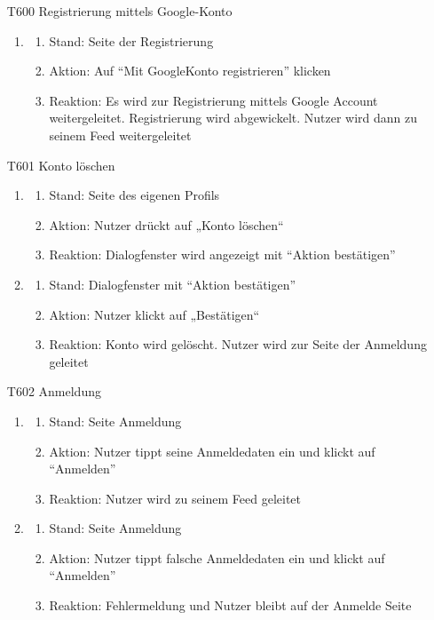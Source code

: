 \documentclass[parskip=full]{scrartcl}
\begin{document}
	\begin{itemize}
		\item[T600] Registrierung mittels Google-Konto
		\begin{enumerate}
			\item
			\begin{enumerate}[nosep]	
				\item Stand: Seite der Registrierung
				\item Aktion:  Auf “Mit \gls{GoogleKonto} registrieren” klicken
				\item Reaktion: Es  wird zur Registrierung mittels Google Account weitergeleitet. Registrierung wird abgewickelt. Nutzer wird dann zu seinem \gls{Feed} weitergeleitet
			\end{enumerate} 
		\end{enumerate}
		
		
		
		\item[T601] Konto löschen
		\begin{enumerate}
			\item
			\begin{enumerate}[nosep]	
				\item Stand: Seite des eigenen Profils
				\item Aktion: Nutzer  drückt auf „Konto löschen“
				\item Reaktion: Dialogfenster wird angezeigt mit “Aktion bestätigen”
			\end{enumerate} 
			\item
			\begin{enumerate}[nosep]	
				\item Stand: Dialogfenster mit “Aktion bestätigen”
				\item Aktion: Nutzer klickt auf „Bestätigen“
				\item Reaktion: Konto wird gelöscht. Nutzer wird zur Seite der Anmeldung geleitet
			\end{enumerate}
		\end{enumerate}
		
		
		
		\item[T602] Anmeldung
		\begin{enumerate}
			\item
			\begin{enumerate}[nosep]	
				\item Stand: Seite Anmeldung
				\item Aktion: Nutzer tippt seine Anmeldedaten ein und klickt auf “Anmelden”
				\item Reaktion:  Nutzer wird zu seinem \gls{Feed} geleitet
			\end{enumerate} 
			\item
			\begin{enumerate}[nosep]	
				\item Stand: Seite Anmeldung
				\item Aktion: Nutzer tippt falsche Anmeldedaten ein und klickt auf “Anmelden”
				\item Reaktion: Fehlermeldung und Nutzer bleibt auf der Anmelde Seite
			\end{enumerate}
		\end{enumerate}
		

\end{itemize}
\end{document}

